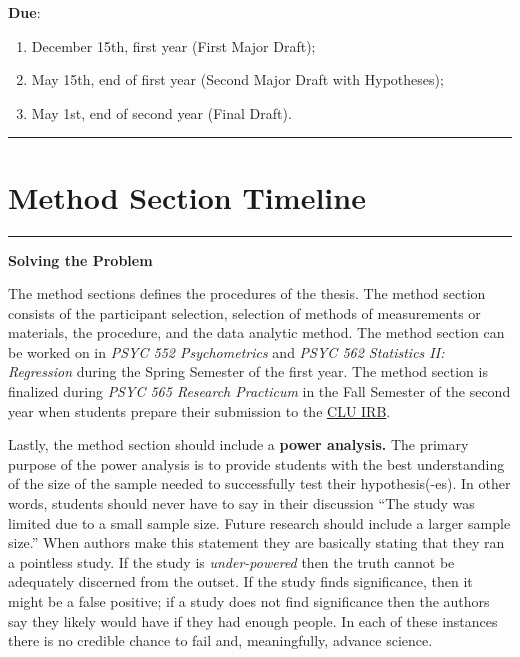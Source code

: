 \documentclass[openany]{book}
\providecommand{\tightlist}{%
  \setlength{\itemsep}{0pt}\setlength{\parskip}{0pt}}
\begin{document}
\textbf{Due}:

\begin{enumerate}
\def\labelenumi{\arabic{enumi}.}
\tightlist
\item
  December 15th, first year (First Major Draft);
\item
  May 15th, end of first year (Second Major Draft with Hypotheses);
\item
  May 1st, end of second year (Final Draft).
\end{enumerate}

\begin{center}\rule{0.5\linewidth}{0.5pt}\end{center}

\hypertarget{method-section-timeline}{%
\section{Method Section Timeline}\label{method-section-timeline}}

\begin{center}\rule{0.5\linewidth}{0.5pt}\end{center}

\textbf{Solving the Problem}

The method sections defines the procedures of the thesis. The method section consists of the participant selection, selection of methods of measurements or materials, the procedure, and the data analytic method. The method section can be worked on in \emph{PSYC 552 Psychometrics} and \emph{PSYC 562 Statistics II: Regression} during the Spring Semester of the first year. The method section is finalized during \emph{PSYC 565 Research Practicum} in the Fall Semester of the second year when students prepare their submission to the \href{https://www.callutheran.edu/research/irb/}{CLU IRB}.

Lastly, the method section should include a \textbf{power analysis.} The primary purpose of the power analysis is to provide students with the best understanding of the size of the sample needed to successfully test their hypothesis(-es). In other words, students should never have to say in their discussion ``The study was limited due to a small sample size. Future research should include a larger sample size.'' When authors make this statement they are basically stating that they ran a pointless study. If the study is \emph{under-powered} then the truth cannot be adequately discerned from the outset. If the study finds significance, then it might be a false positive; if a study does not find significance then the authors say they likely would have if they had enough people. In each of these instances there is no credible chance to fail and, meaningfully, advance science.
\end{document}

